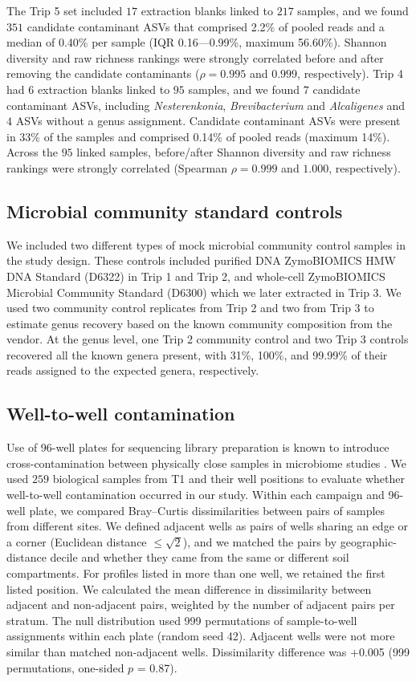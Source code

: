 \documentclass[11pt]{article}
\begin{document}
The Trip 5 set included $17$ extraction blanks linked to $217$ samples, and we found $351$ candidate contaminant ASVs that comprised 2.2\% of pooled reads and a median of 0.40\% per sample (IQR 0.16—0.99\%, maximum 56.60\%). Shannon diversity and raw richness rankings were strongly correlated before and after removing the candidate contaminants ($\rho = 0.995$ and $0.999$, respectively). Trip 4 had $6$ extraction blanks linked to $95$ samples, and we found $7$ candidate contaminant ASVs, including \textit{Nesterenkonia}, \textit{Brevibacterium} and \textit{Alcaligenes} and $4$ ASVs without a genus assignment. Candidate contaminant ASVs were present in 33\% of the samples and comprised 0.14\% of pooled reads (maximum 14\%). Across the $95$ linked samples, before/after Shannon diversity and raw richness rankings were strongly correlated (Spearman $\rho=0.999$ and $1.000$, respectively).


\subsection{Microbial community standard controls}
We included two different types of mock microbial community control samples in the study design. These controls included purified DNA ZymoBIOMICS HMW DNA Standard (D6322) in Trip 1 and Trip 2, and whole-cell ZymoBIOMICS Microbial Community Standard (D6300) which we later extracted in Trip 3. We used two community control replicates from Trip 2 and two from Trip 3 to estimate genus recovery based on the known community composition from the vendor. At the genus level, one Trip 2 community control and two Trip 3 controls recovered all the known genera present, with 31\%, 100\%, and  99.99\% of their reads assigned to the expected genera, respectively.

\subsection{Well-to-well contamination}
Use of 96-well plates for sequencing library preparation is known to introduce cross-contamination between physically close samples in microbiome studies \cite{welltowell}. We used $259$ biological samples from T1 and their well positions to evaluate whether well-to-well contamination occurred in our study. Within each campaign and 96-well plate, we compared Bray--Curtis dissimilarities between pairs of samples from different sites. We defined adjacent wells as pairs of wells sharing an edge or a corner (Euclidean distance $\le \sqrt{2}$), and we matched the pairs by geographic-distance decile and whether they came from the same or different soil compartments. For profiles listed in more than one well, we retained the first listed position. We calculated the mean difference in dissimilarity between adjacent and non-adjacent pairs, weighted by the number of adjacent pairs per stratum. The null distribution used 999 permutations of sample-to-well assignments within each plate (random seed 42). Adjacent wells were not more similar than matched non-adjacent wells. Dissimilarity difference was +0.005 (999 permutations, one-sided $p$ = 0.87).
\end{document}
